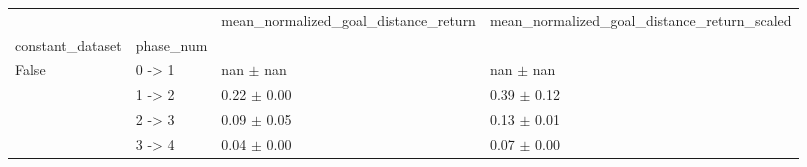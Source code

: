 \begin{tabular}{llll}
\toprule
 &  & mean_normalized_goal_distance_return & mean_normalized_goal_distance_return_scaled \\
constant_dataset & phase_num &  &  \\
\midrule
\multirow[t]{4}{*}{False} & 0 -> 1 & nan $\pm$ nan & nan $\pm$ nan \\
 & 1 -> 2 & 0.22 $\pm$ 0.00 & 0.39 $\pm$ 0.12 \\
 & 2 -> 3 & 0.09 $\pm$ 0.05 & 0.13 $\pm$ 0.01 \\
 & 3 -> 4 & 0.04 $\pm$ 0.00 & 0.07 $\pm$ 0.00 \\
\cline{1-4}
\bottomrule
\end{tabular}
